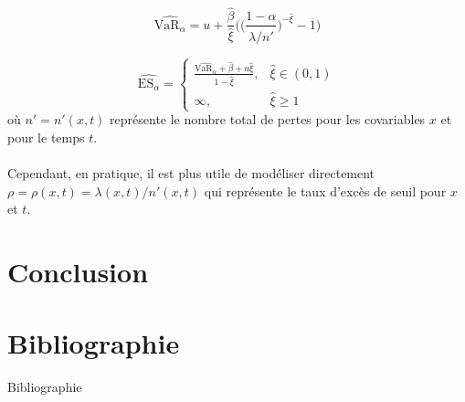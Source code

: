 \documentclass[aspectratio=169, 12pt, french]{beamer}
\begin{document}
\begin{frame}
\begin{equation}
\widehat{\text{VaR}_\alpha} = u + \frac{\hat\beta}{\hat\xi} \Bigg(\Bigg( \frac{1-\alpha}{\hat\lambda/n'}\Bigg)^{-\hat\xi} -1 \Bigg)
\end{equation}

\begin{equation}
\widehat{\text{ES}_\alpha} =
\begin{cases}
\frac{\widehat{\text{VaR}_\alpha} + \hat\beta + u\hat\xi}{1-\hat\xi}, & \hat{\xi} \in (0,1) \\
\infty, & \hat\xi 	\ge 1
\end{cases}
\end{equation}
où $n' = n'(x,t)$ représente le nombre total de pertes pour les covariables $x$ et pour le temps $t$.\\~\\ Cependant, en pratique, il est plus utile de modéliser directement $\rho = \rho(x, t) = \lambda(x,t)/n'(x, t)$ qui représente le taux d'excès de seuil pour $x$ et $t$.
\end{frame}





\section{Conclusion}

\section*{Bibliographie}
\nocite{*}

\begin{frame}[allowframebreaks]{Bibliographie}

\end{frame}
\end{document}

